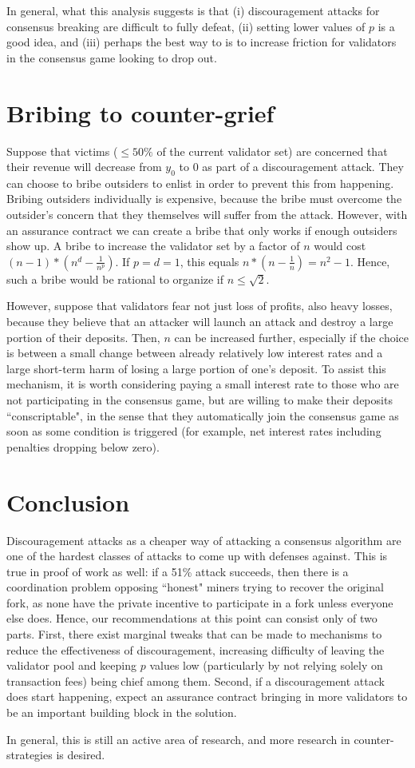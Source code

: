 \documentclass[12pt]{article}
\begin{document}
In general, what this analysis suggests is that (i) discouragement attacks for consensus breaking are difficult to fully defeat, (ii) setting lower values of $p$ is a good idea, and (iii) perhaps the best way to is to increase friction for validators in the consensus game looking to drop out.

\section{Bribing to counter-grief}

Suppose that victims ($\le 50\%$ of the current validator set) are concerned that their revenue will decrease from $y_0$ to 0 as part of a discouragement attack. They can choose to bribe outsiders to enlist in order to prevent this from happening. Bribing outsiders individually is expensive, because the bribe must overcome the outsider's concern that they themselves will suffer from the attack. However, with an assurance contract we can create a bribe that only works if enough outsiders show up. A bribe to increase the validator set by a factor of $n$ would cost $(n - 1) * (n^d - \frac{1}{n^p})$. If $p = d = 1$, this equals $n * (n - \frac{1}{n}) = n^2 - 1$. Hence, such a bribe would be rational to organize if $n \le \sqrt{2}$.

However, suppose that validators fear not just loss of profits, also heavy losses, because they believe that an attacker will launch an attack and destroy a large portion of their deposits. Then, $n$ can be increased further, especially if the choice is between a small change between already relatively low interest rates and a large short-term harm of losing a large portion of one's deposit. To assist this mechanism, it is worth considering paying a small interest rate to those who are not participating in the consensus game, but are willing to make their deposits ``conscriptable", in the sense that they automatically join the consensus game as soon as some condition is triggered (for example, net interest rates including penalties dropping below zero).


\section{Conclusion}

Discouragement attacks as a cheaper way of attacking a consensus algorithm are one of the hardest classes of attacks to come up with defenses against. This is true in proof of work as well: if a 51\% attack succeeds, then there is a coordination problem opposing ``honest" miners trying to recover the original fork, as none have the private incentive to participate in a fork unless everyone else does. Hence, our recommendations at this point can consist only of two parts. First, there exist marginal tweaks that can be made to mechanisms to reduce the effectiveness of discouragement, increasing difficulty of leaving the validator pool and keeping $p$ values low (particularly by not relying solely on transaction fees) being chief among them. Second, if a discouragement attack does start happening, expect an assurance contract bringing in more validators to be an important building block in the solution.

In general, this is still an active area of research, and more research in counter-strategies is desired.



\end{document}
